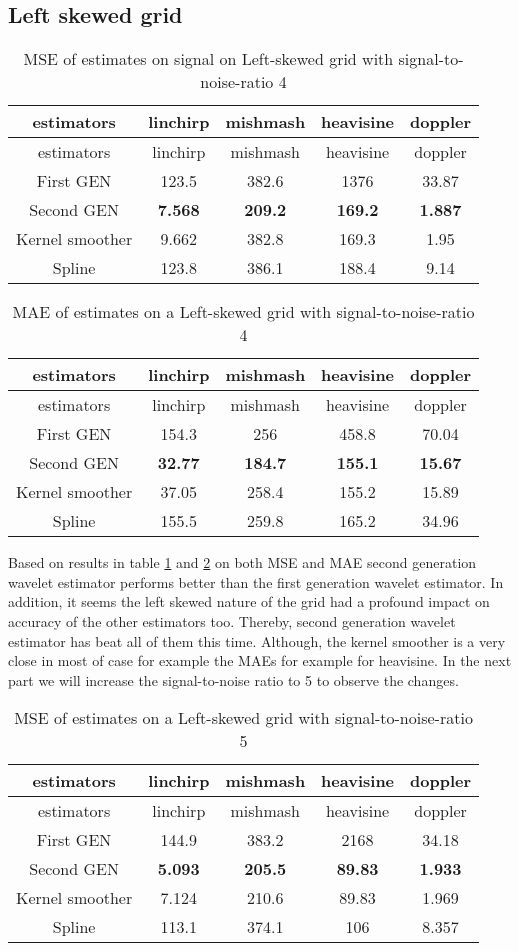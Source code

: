 \documentclass[12pt,twoside, a4paper]{reedthesis}
\begin{document}
\hypertarget{left-skewed-grid}{%
\subsection{Left skewed grid}\label{left-skewed-grid}}
\begin{longtable}[]{@{}ccccc@{}}
\caption{\label{tbl:msebetaleft4}MSE of estimates on signal on Left-skewed grid with signal-to-noise-ratio 4}\tabularnewline
\toprule
estimators & linchirp & mishmash & heavisine & doppler\tabularnewline
\midrule
\endfirsthead
\toprule
estimators & linchirp & mishmash & heavisine & doppler\tabularnewline
\midrule
\endhead
First GEN & 123.5 & 382.6 & 1376 & 33.87\tabularnewline
Second GEN & \textbf{7.568} & \textbf{209.2} & \textbf{169.2} & \textbf{1.887}\tabularnewline
Kernel smoother & 9.662 & 382.8 & 169.3 & 1.95\tabularnewline
Spline & 123.8 & 386.1 & 188.4 & 9.14\tabularnewline
\bottomrule
\end{longtable}
\begin{longtable}[]{@{}ccccc@{}}
\caption{\label{tbl:maebetaleft4}MAE of estimates on a Left-skewed grid with signal-to-noise-ratio 4}\tabularnewline
\toprule
estimators & linchirp & mishmash & heavisine & doppler\tabularnewline
\midrule
\endfirsthead
\toprule
estimators & linchirp & mishmash & heavisine & doppler\tabularnewline
\midrule
\endhead
First GEN & 154.3 & 256 & 458.8 & 70.04\tabularnewline
Second GEN & \textbf{32.77} & \textbf{184.7} & \textbf{155.1} & \textbf{15.67}\tabularnewline
Kernel smoother & 37.05 & 258.4 & 155.2 & 15.89\tabularnewline
Spline & 155.5 & 259.8 & 165.2 & 34.96\tabularnewline
\bottomrule
\end{longtable}
Based on results in table \ref{tbl:msebetaleft4} and \ref{tbl:maebetaleft4} on both MSE and MAE second generation wavelet estimator performs better than the first generation wavelet estimator. In addition, it seems the left skewed nature of the grid had a profound impact on accuracy of the other estimators too. Thereby, second generation wavelet estimator has beat all of them this time. Although, the kernel smoother is a very close in most of case for example the MAEs for example for heavisine. In the next part we will increase the signal-to-noise ratio to 5 to observe the changes.
\begin{longtable}[]{@{}ccccc@{}}
\caption{\label{tbl:msebetaleft5}MSE of estimates on a Left-skewed grid with signal-to-noise-ratio 5}\tabularnewline
\toprule
estimators & linchirp & mishmash & heavisine & doppler\tabularnewline
\midrule
\endfirsthead
\toprule
estimators & linchirp & mishmash & heavisine & doppler\tabularnewline
\midrule
\endhead
First GEN & 144.9 & 383.2 & 2168 & 34.18\tabularnewline
Second GEN & \textbf{5.093} & \textbf{205.5} & \textbf{89.83} & \textbf{1.933}\tabularnewline
Kernel smoother & 7.124 & 210.6 & 89.83 & 1.969\tabularnewline
Spline & 113.1 & 374.1 & 106 & 8.357\tabularnewline
\bottomrule
\end{longtable}
\end{document}
